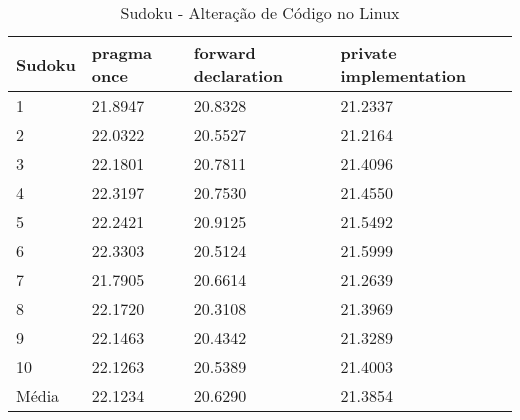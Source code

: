 \begin{table}[!h]
\centering
\caption{Sudoku - Alteração de Código no Linux}
\label{tab:alteracao_de_codigo:linux:sudoku}
\begin{tabular}{llll}
\textbf{Sudoku} & \textbf{pragma once} & \textbf{forward declaration} & \textbf{private implementation}   \\ \toprule
1                                    &  21.8947  & 20.8328   & 21.2337   \\ 
2                                    &  22.0322  & 20.5527   & 21.2164   \\ 
3                                    &  22.1801  & 20.7811   & 21.4096   \\ 
4                                    &  22.3197  & 20.7530   & 21.4550   \\ 
5                                    &  22.2421  & 20.9125   & 21.5492   \\ 
6                                    &  22.3303  & 20.5124   & 21.5999   \\ 
7                                    &  21.7905  & 20.6614   & 21.2639   \\ 
8                                    &  22.1720  & 20.3108   & 21.3969   \\ 
9                                    &  22.1463  & 20.4342   & 21.3289   \\ 
10                                   &  22.1263  & 20.5389   & 21.4003   \\ \bottomrule
Média                                &  22.1234  & 20.6290   & 21.3854   \\ 
\end{tabular}
\end{table}

